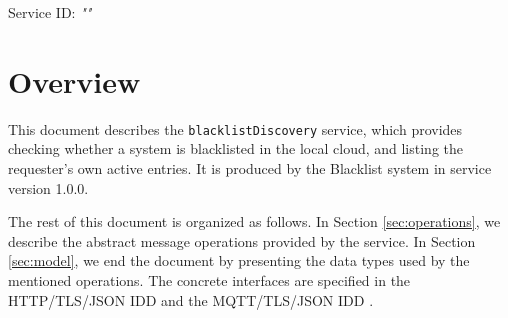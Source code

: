 \documentclass[a4paper]{arrowhead}
\begin{document}
\sloppy

\ArrowheadSetup

\begin{center}
  \vspace*{1cm}
  \huge{\arrowtitle}

  \vspace*{0.2cm}
  \LARGE{\arrowtype}
  \vspace*{1cm}

  \Large{Service ID: \textit{"\arrowid"}}

  \vspace*{\fill}


  \vspace*{1cm}
  \vspace*{\fill}

  \begin{abstract}
    This document describes the \texttt{blacklistDiscovery} service, version 1.0.0, produced by the Blacklist support system of Arrowhead 5.2.2.
  \end{abstract}

  \vspace*{1cm}
\end{center}

\newpage

\tableofcontents
\newpage

\section{Overview}
\label{sec:overview}

This document describes the \texttt{blacklistDiscovery} service, which provides checking whether a system is blacklisted in the local cloud, and listing the requester's own active entries.
It is produced by the Blacklist system \cite{bl-sysd} in service version 1.0.0.

The rest of this document is organized as follows.
In Section \ref{sec:operations}, we describe the abstract message operations provided by the service.
In Section \ref{sec:model}, we end the document by presenting the data types used by the mentioned operations.
The concrete interfaces are specified in the HTTP/TLS/JSON IDD \cite{bl-blacklistDiscovery-http-idd} and the MQTT/TLS/JSON IDD \cite{bl-blacklistDiscovery-mqtt-idd}.
\end{document}
